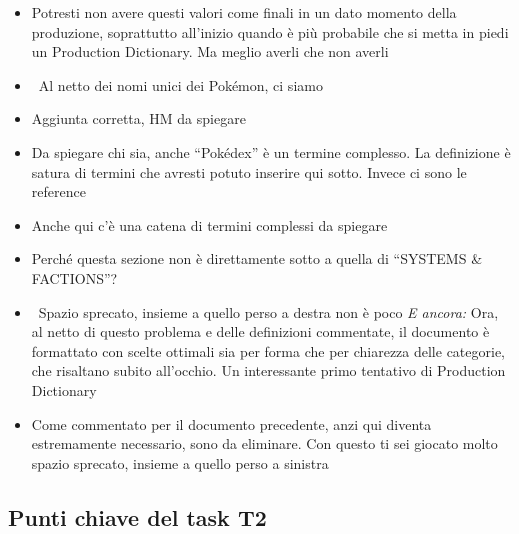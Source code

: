 {\begin{itemize}
  \item {} Potresti non avere questi valori come finali in un dato momento della produzione, soprattutto all'inizio quando è più probabile che si metta in piedi un Production Dictionary. Ma meglio averli che non averli
  \item {} \rvBene\ Al netto dei nomi unici dei Pokémon, ci siamo
  \item {} Aggiunta corretta, HM da spiegare
  \item {} Da spiegare chi sia, anche ``Pokédex'' è un termine complesso. La definizione è satura di termini che avresti potuto inserire qui sotto. Invece ci sono le reference
  \item {} Anche qui c'è una catena di termini complessi da spiegare
  \item {} Perché questa sezione non è direttamente sotto a quella di ``SYSTEMS \& FACTIONS''?
  \item \rvVuoto\ Spazio sprecato, insieme a quello perso a destra non è poco \emph{E ancora:} Ora, al netto di questo problema e delle definizioni commentate, il documento è formattato con scelte ottimali sia per forma che per chiarezza delle categorie, che risaltano subito all'occhio. Un interessante primo tentativo di Production Dictionary
  \item {} Come commentato per il documento precedente, anzi qui diventa estremamente necessario, sono da eliminare. Con questo ti sei giocato molto spazio sprecato, insieme a quello perso a sinistra
\end{itemize}
}

\subsection{Punti chiave del task T2}
\label{rv:t2:sec:punti-chiave}

